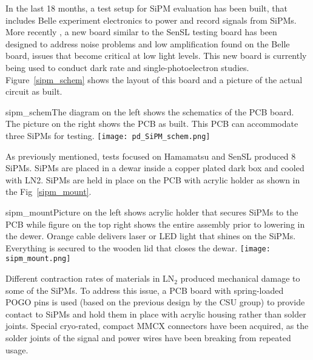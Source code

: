 In the last 18 months, a test setup for SiPM evaluation has been built,
that includes Belle experiment  electronics to power and record signals
from SiPMs.  More recently , a new board similar to the
SenSL testing board has been designed to address noise problems and low amplification
found on the Belle board, issues that become critical at low light levels. This new board is currently
being used to conduct dark rate and single-photoelectron studies.
Figure~\ref{sipm_schem} shows the layout of this board and a
picture of the actual circuit as built.

\begin{cdrfigure}{sipm_schem}{The diagram on the left shows the schematics
    of the PCB board. The picture  on the right shows the PCB as
    built. This PCB can accommodate three SiPMs for testing.}  
  \texttt{[image: pd\_SiPM\_schem.png]}
\end{cdrfigure}

As previously mentioned, tests focused on Hamamatsu and SenSL produced
8 SiPMs.%
SiPMs are placed in a dewar inside a copper plated dark box and cooled
with LN2. SiPMs are held in place on the PCB with acrylic holder as
shown in the Fig~\ref{sipm_mount}. 

\begin{cdrfigure}{sipm_mount}{Picture on the left shows acrylic holder that
    secures SiPMs to the PCB while figure on the top right shows the
    entire assembly prior to lowering in the dewer. Orange cable
    delivers laser or LED light that shines on the SiPMs. Everything
    is secured to the wooden lid that closes the dewar.}   
  \texttt{[image: sipm\_mount.png]}
\end{cdrfigure}

Different contraction rates of materials in
LN$_2$ produced mechanical damage to some of the SiPMs. To address this issue, a PCB board
with spring-loaded POGO pins is used (based on the previous design by
the CSU group) to provide contact to SiPMs and
hold them in place with acrylic housing rather than solder joints. Special cryo-rated, compact MMCX connectors have been acquired, as the
solder joints of the signal and power wires have been breaking from
repeated usage.

